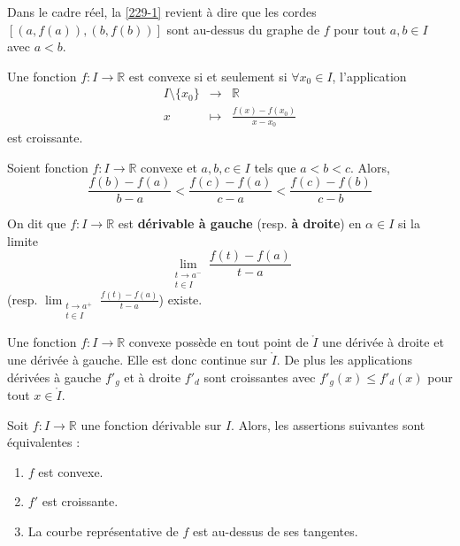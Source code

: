 
	\begin{remark}
		Dans le cadre réel, la \cref{229-1} revient à dire que les cordes $[(a, f(a)), (b, f(b))]$ sont au-dessus du graphe de $f$ pour tout $a, b \in I$ avec $a < b$.
	\end{remark}

	\begin{proposition}
		Une fonction $f : I \rightarrow \mathbb{R}$ est convexe si et seulement si $\forall x_0 \in I$, l'application
		\[
		\begin{array}{ccc}
			I \setminus \{ x_0 \} &\rightarrow& \mathbb{R} \\
			x &\mapsto& \frac{f(x) - f(x_0)}{x - x_0}
		\end{array}
		\]
		est croissante.
	\end{proposition}

	\begin{corollary}
		Soient fonction $f : I \rightarrow \mathbb{R}$ convexe et $a, b, c \in I$ tels que $a < b < c$. Alors,
		\[ \frac{f(b) - f(a)}{b-a} < \frac{f(c) - f(a)}{c-a} < \frac{f(c) - f(b)}{c-b} \]
	\end{corollary}


	\begin{definition}
		On dit que $f : I \rightarrow \mathbb{R}$ est \textbf{dérivable à gauche} (resp. \textbf{à droite}) en $\alpha \in I$ si la limite
		\[ \lim_{\substack{t \rightarrow a^{-} \\ t \in I}} \frac{f(t) - f(a)}{t-a} \]
		(resp. $\lim_{\substack{t \rightarrow a^{+} \\ t \in I}} \frac{f(t) - f(a)}{t-a}$) existe.
	\end{definition}


	\begin{proposition}
		Une fonction $f : I \rightarrow \mathbb{R}$ convexe possède en tout point de $\mathring{I}$ une dérivée à droite et une dérivée à gauche. Elle est donc continue sur $\mathring{I}$. De plus les applications dérivées à gauche $f'_g$ et à droite $f'_d$ sont croissantes avec $f'_g(x) \leq f'_d(x)$ pour tout $x \in \mathring{I}$.
	\end{proposition}

	\begin{theorem}
		Soit $f : I \rightarrow \mathbb{R}$ une fonction dérivable sur $I$. Alors, les assertions suivantes sont équivalentes :
		\begin{enumerate}[label=(\roman*)]
			\item $f$ est convexe.
			\item $f'$ est croissante.
			\item La courbe représentative de $f$ est au-dessus de ses tangentes.
		\end{enumerate}
	\end{theorem}

